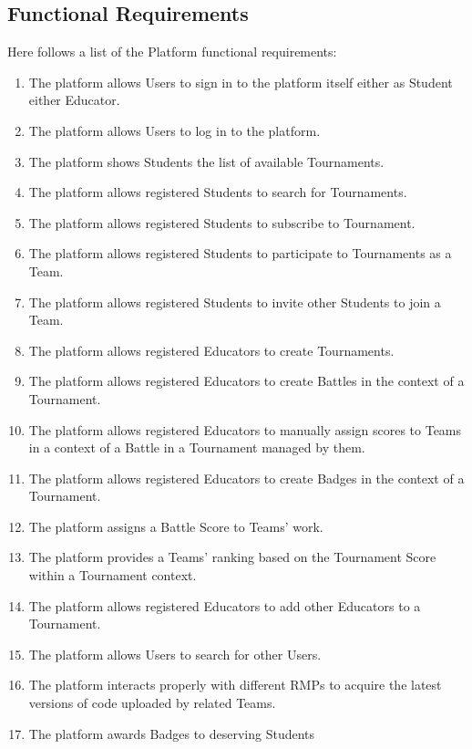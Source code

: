 \newpage

\subsection{Functional Requirements}
Here follows a list of the Platform functional requirements:
\begin{enumerate}[label= \textbf{R\arabic*}]
    \item The platform allows Users to sign in to the platform itself either as Student either Educator. \label{req:reqSignin}
    \item The platform allows Users to log in to the platform. \label{req:reqLogin}
    \item The platform shows Students the list of available Tournaments. \label{req:reqShowTournaments}
    \item The platform allows registered Students to search for Tournaments. \label{req:reqSearchForTournament}
    \item The platform allows registered Students to subscribe to Tournament. \label{req:reqTournamentSubscription}
    \item The platform allows registered Students to participate to Tournaments as a Team. \label{req:reqCreateTeam}
    \item The platform allows registered Students to invite other Students to join a Team. \label{req:reqJoinTeam}
    \item The platform allows registered Educators to create Tournaments. \label{req:reqCreateTournaments}
    \item The platform allows registered Educators to create Battles in the context of a Tournament. \label{req:reqCreateBattle}
    \item The platform allows registered Educators to manually assign scores to Teams in a context of a Battle in a Tournament managed by them. \label{req:reqManualEvalCode} 
    \item The platform allows registered Educators to create Badges in the context of a Tournament. \label{req:reqCreateBadge}
    \item The platform assigns a Battle Score to Teams' work. \label{req:reqEvaluateCode}
    \item The platform provides a Teams' ranking based on the Tournament Score within a Tournament context. \label{req:reqRankingsUpdate}
    \item The platform allows registered Educators to add other Educators to a Tournament. \label{req:reqJoinManagement}
    \item The platform allows Users to search for other Users. \label{req:reqSearchForUsers}
    \item The platform interacts properly with different RMPs to acquire the latest versions of code uploaded by related Teams. \label{req:reqPullRMP}
    \item The platform awards Badges to deserving Students \label{req:reqAssignBadge}
\end{enumerate}

